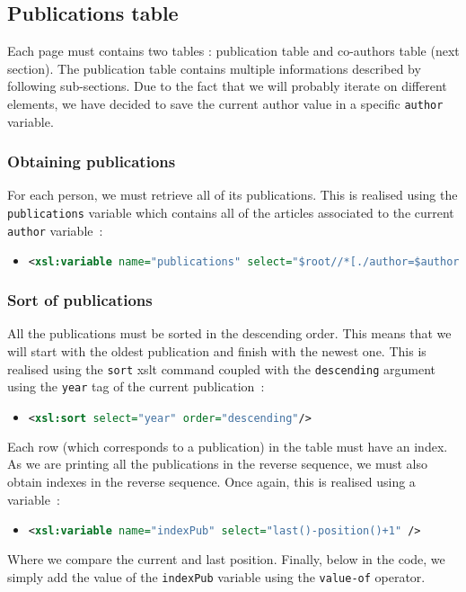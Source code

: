 \documentclass{article}
\begin{document}
  \subsection{Publications table}
  Each page must contains two tables : publication table and co-authors table (next section). The publication table contains multiple informations described by following sub-sections. Due to the fact that we will probably iterate on different elements, we have decided to save the current author value in a specific \verb|author| variable.
    \subsubsection{Obtaining publications}
      For each person, we must retrieve all of its publications. This is realised using the \verb|publications| variable which contains all of the articles associated to the current \verb|author| variable~:      
 \begin{itemize}
	\item \begin{lstlisting}[language=XML]
<xsl:variable name="publications" select="$root//*[./author=$author]" />\end{lstlisting}
      \end{itemize}
      
    \subsubsection{Sort of publications}
      All the publications must be sorted in the descending order. This means that we will start with the oldest publication and finish with the newest one. This is realised using the \verb|sort| xslt command coupled with the \verb|descending| argument using the \verb|year| tag of the current publication~:
      \begin{itemize}
	\item \begin{lstlisting}[language=XML]
<xsl:sort select="year" order="descending"/>\end{lstlisting}
      \end{itemize}
      Each row (which corresponds to a publication) in the table must have an index. As we are printing all the publications in the reverse sequence, we must also obtain indexes in the reverse sequence. Once again, this is realised using a variable~:
      \begin{itemize}
	\item \begin{lstlisting}[language=XML]
<xsl:variable name="indexPub" select="last()-position()+1" />\end{lstlisting}
      \end{itemize}
      Where we compare the current and last position. Finally, below in the code, we simply add the value of the \verb|indexPub| variable using the \verb|value-of| operator. 
      
\end{document}
